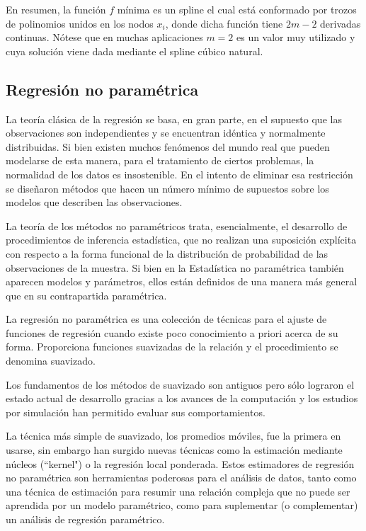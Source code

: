 \documentclass[
  12pt,
]{krantz}
\begin{document}
En resumen, la función \(f\) mínima es un spline el cual está conformado por trozos de polinomios unidos en los nodos \(x_{i}\), donde dicha función tiene \(2m-2\) derivadas continuas. Nótese que en muchas aplicaciones \(m=2\) es un valor muy utilizado y cuya solución viene dada mediante el spline cúbico natural.

\hypertarget{regresion-no-parametrica}{%
\subsection{Regresión no paramétrica}\label{regresion-no-parametrica}}

La teoría clásica de la regresión se basa, en gran parte, en el supuesto que las observaciones son independientes y se encuentran idéntica y normalmente distribuidas. Si bien existen muchos fenómenos del mundo real que pueden modelarse de esta manera, para el tratamiento de ciertos problemas, la normalidad de los datos es insostenible. En el intento de eliminar esa restricción se diseñaron métodos que hacen un número mínimo de supuestos sobre los modelos que describen las observaciones.

La teoría de los métodos no paramétricos trata, esencialmente, el desarrollo de procedimientos de inferencia estadística, que no realizan una suposición explícita con respecto a la forma funcional de la
distribución de probabilidad de las observaciones de la muestra. Si bien en la Estadística no paramétrica también aparecen modelos y parámetros, ellos están definidos de una manera más general que en su contrapartida paramétrica.

La regresión no paramétrica es una colección de técnicas para el ajuste de funciones de regresión cuando existe poco conocimiento a priori acerca de su forma. Proporciona funciones suavizadas de la relación y el procedimiento se denomina suavizado.

Los fundamentos de los métodos de suavizado son antiguos pero sólo lograron el estado actual de desarrollo gracias a los avances de la computación y los estudios por simulación han permitido evaluar sus comportamientos.

La técnica más simple de suavizado, los promedios móviles, fue la primera en usarse, sin embargo han surgido nuevas técnicas como la estimación mediante núcleos (``kernel") o la regresión local ponderada. Estos estimadores de regresión no paramétrica son herramientas poderosas para el análisis de datos, tanto como una técnica de estimación para resumir una relación compleja que no puede ser aprendida por un modelo paramétrico, como para suplementar (o complementar) un análisis de regresión paramétrico.
\end{document}
